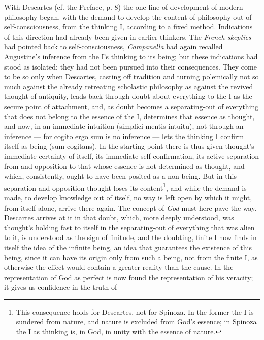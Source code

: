 \documentclass[12pt,a4paper,openany]{book}
\newcommand{\opage}[1]{\marginnote{\footnotesize\textit{[#1]}}}
\begin{document}
With Descartes (cf. the Preface, p. 8) the one line of development of
modern philosophy began, with the demand to develop the content of
philosophy out of self-consciousness, from the thinking I, according to
a fixed method.
\opage{18}\setcounter{footnote}{0}Indications of this direction had already
been given in earlier thinkers. The \emph{French skeptics} had pointed
back to self-consciousness, \emph{Campanella} had again recalled
Augustine's inference from the I's thinking to its being; but these
indications had stood as isolated; they had not been pursued into their
consequences. They come to be so only when Descartes, casting off
tradition and turning polemically not so much against the already
retreating scholastic philosophy as against the revived thought of
antiquity, leads back through doubt about everything to the I as the
secure point of attachment, and, as doubt becomes a separating-out of
everything that does not belong to the essence of the I, determines that
essence as thought, and now, in an immediate intuition (simplici mentis
intuitu), not through an inference --- for cogito ergo sum is no
inference --- lets the thinking I confirm itself as being (sum
cogitans). In the starting point there is thus given thought's immediate
certainty of itself, its immediate self-confirmation, its active
separation from and opposition to that whose essence is not determined
as thought, and which, consistently, ought to have been posited as a
non-being. But in this separation and opposition thought loses its
content\footnote{This consequence holds for Descartes, not for Spinoza.
In the former the I is sundered from nature, and nature is excluded from
God's essence; in Spinoza the I as thinking is, in God, in unity with the
essence of nature.}, and while the demand is made, to develop knowledge
out of itself, no way is left open by which it might, from itself alone,
arrive there again. The concept of \emph{God} must here pave the way.
Descartes arrives at it in that doubt, which, more deeply understood,
was thought's holding fast to itself in the separating-out of everything
that was alien to it, is understood as the sign of finitude, and the
doubting, finite I now finds in itself the idea of the infinite being,
an idea that guarantees the existence of this being, since it can have
its origin only from such a being, not from the finite I, as otherwise
the effect
\opage{19}\setcounter{footnote}{0}would contain a greater reality than the
cause. In the representation of God as perfect is now found the
representation of his veracity; it gives us confidence in the truth of
\end{document}
